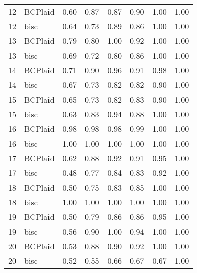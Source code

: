 \begin{table}[ht]
\begin{tabular}{rlrrrrrr}
   12 & BCPlaid & 0.60 & 0.87 & 0.87 & 0.90 & 1.00 & 1.00 \\ 
   12 & bisc & 0.64 & 0.73 & 0.89 & 0.86 & 1.00 & 1.00 \\ 
   13 & BCPlaid & 0.79 & 0.80 & 1.00 & 0.92 & 1.00 & 1.00 \\ 
   13 & bisc & 0.69 & 0.72 & 0.80 & 0.86 & 1.00 & 1.00 \\ 
   14 & BCPlaid & 0.71 & 0.90 & 0.96 & 0.91 & 0.98 & 1.00 \\ 
   14 & bisc & 0.67 & 0.73 & 0.82 & 0.82 & 0.90 & 1.00 \\ 
   15 & BCPlaid & 0.65 & 0.73 & 0.82 & 0.83 & 0.90 & 1.00 \\ 
   15 & bisc & 0.63 & 0.83 & 0.94 & 0.88 & 1.00 & 1.00 \\ 
   16 & BCPlaid & 0.98 & 0.98 & 0.98 & 0.99 & 1.00 & 1.00 \\ 
   16 & bisc & 1.00 & 1.00 & 1.00 & 1.00 & 1.00 & 1.00 \\ 
   17 & BCPlaid & 0.62 & 0.88 & 0.92 & 0.91 & 0.95 & 1.00 \\ 
   17 & bisc & 0.48 & 0.77 & 0.84 & 0.83 & 0.92 & 1.00 \\ 
   18 & BCPlaid & 0.50 & 0.75 & 0.83 & 0.85 & 1.00 & 1.00 \\ 
   18 & bisc & 1.00 & 1.00 & 1.00 & 1.00 & 1.00 & 1.00 \\ 
   19 & BCPlaid & 0.50 & 0.79 & 0.86 & 0.86 & 0.95 & 1.00 \\ 
   19 & bisc & 0.56 & 0.90 & 1.00 & 0.94 & 1.00 & 1.00 \\ 
   20 & BCPlaid & 0.53 & 0.88 & 0.90 & 0.92 & 1.00 & 1.00 \\ 
   20 & bisc & 0.52 & 0.55 & 0.66 & 0.67 & 0.67 & 1.00 \\ 
   \bottomrule
\end{tabular}
\end{table}
